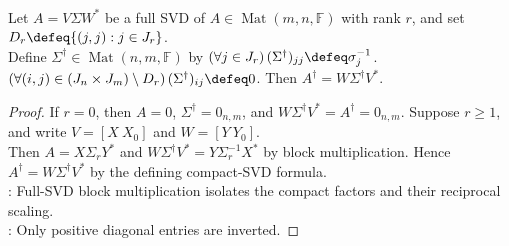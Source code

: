 \begin{corollary} \label{cor:pseudoinverse-from-full-svd} \\
Let $A=V\Sigma W^*$ be a full SVD of $A\in\operatorname{Mat}(m,n,\mathbb{F})$ with rank $r$, and set $D_r\defeq\{(j,j):j\in J_r\}$.\\
Define $\Sigma^{\dagger}\in\operatorname{Mat}(n,m,\mathbb{F})$ by $(\forall j\in J_r)\,(\Sigma^{\dagger})_{jj}\defeq\sigma_j^{-1}$. $(\forall(i,j)\in(J_n\times J_m)\setminus D_r)\,(\Sigma^{\dagger})_{ij}\defeq0$. Then $A^{\dagger}=W\Sigma^{\dagger}V^*$.
\begin{proof}
If $r=0$, then $A=0$, $\Sigma^{\dagger}=0_{n,m}$, and $W\Sigma^{\dagger}V^*=A^{\dagger}=0_{n,m}$. Suppose $r\geq1$, and write $V=[X\ X_0]$ and $W=[Y\ Y_0]$.\\
Then $A=X\Sigma_rY^*$ and $W\Sigma^{\dagger}V^*=Y\Sigma_r^{-1}X^*$ by block multiplication. Hence $A^{\dagger}=W\Sigma^{\dagger}V^*$ by the defining compact-SVD formula.\\
: Full-SVD block multiplication isolates the compact factors and their reciprocal scaling.\\
: Only positive diagonal entries are inverted.
\end{proof}
\end{corollary}

